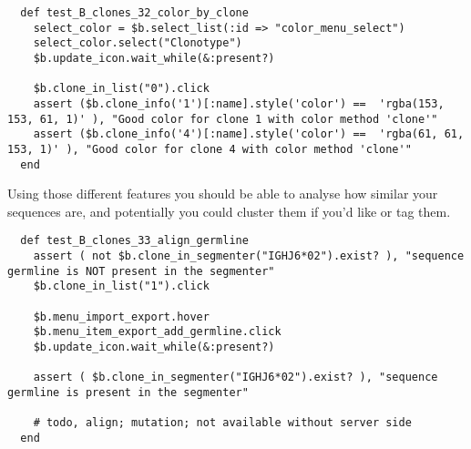 \begin{verbatim}
  def test_B_clones_32_color_by_clone
    select_color = $b.select_list(:id => "color_menu_select")
    select_color.select("Clonotype")
    $b.update_icon.wait_while(&:present?)

    $b.clone_in_list("0").click
    assert ($b.clone_info('1')[:name].style('color') ==  'rgba(153, 153, 61, 1)' ), "Good color for clone 1 with color method 'clone'"
    assert ($b.clone_info('4')[:name].style('color') ==  'rgba(61, 61, 153, 1)' ), "Good color for clone 4 with color method 'clone'"
  end
\end{verbatim}


Using those different features you should be able to analyse how similar your
sequences are, and potentially you could cluster them if you'd like or tag them.

\begin{verbatim}
  def test_B_clones_33_align_germline
    assert ( not $b.clone_in_segmenter("IGHJ6*02").exist? ), "sequence germline is NOT present in the segmenter"
    $b.clone_in_list("1").click

    $b.menu_import_export.hover
    $b.menu_item_export_add_germline.click
    $b.update_icon.wait_while(&:present?)

    assert ( $b.clone_in_segmenter("IGHJ6*02").exist? ), "sequence germline is present in the segmenter"

    # todo, align; mutation; not available without server side
  end
\end{verbatim}

